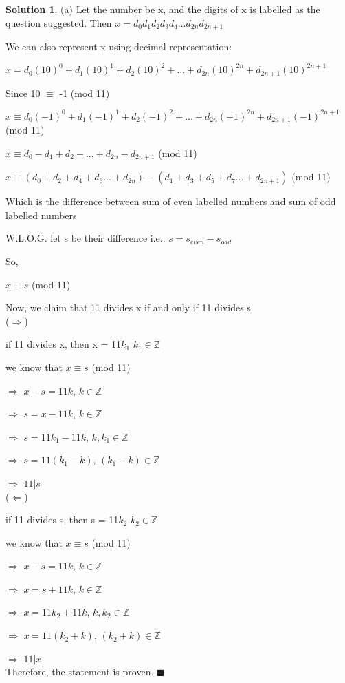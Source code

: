 \documentclass{article}
\theoremstyle{definition}
\newtheorem*{solution}{Solution}
\begin{document}
\begin{solution}
(a) Let the number be x, and the digits of x is labelled as the question suggested. Then \(x=d_0d_1d_2d_3d_4...d_{2n}d_{2n+1}\)

We can also represent x using decimal representation:

\(x=d_0(10)^0+d_1(10)^1+d_2(10)^2+...+d_{2n}(10)^{2n}+d_{2n+1}(10)^{2n+1}\)

Since 10 \(\equiv\) -1 (mod 11)

\(x \equiv d_0(-1)^0+d_1(-1)^1+d_2(-1)^2+...+d_{2n}(-1)^{2n}+d_{2n+1}(-1)^{2n+1}\) (mod 11)

\(x \equiv d_0-d_1+d_2-...+d_{2n}-d_{2n+1}\) (mod 11)

\(x \equiv (d_0+d_2+d_4+d_6...+d_{2n}) - (d_1+d_3+d_5+d_7...+d_{2n+1})\) (mod 11)

Which is the difference between sum of even labelled numbers and sum of odd labelled numbers

W.L.O.G. let s be their difference i.e.: \(s = s_{even} - s_{odd}\)

So, 

\(x \equiv s\) (mod 11)

Now, we claim that 11 divides x if and only if 11 divides s.\\

(\(\Rightarrow\))

if 11 divides x, then x = 11\(k_1\)  \(k_1\in\mathbb{Z}\)

we know that \(x \equiv s\) (mod 11)

\(\Rightarrow\) \(x-s = 11k\),   \(k \in \mathbb{Z}\)

\(\Rightarrow\) \(s = x - 11k\),   \(k \in \mathbb{Z}\)

\(\Rightarrow\) \(s = 11k_1 - 11k\),   \(k,k_1 \in \mathbb{Z}\)

\(\Rightarrow\) \(s = 11(k_1 - k)\),   \((k_1-k) \in \mathbb{Z}\)

\(\Rightarrow\) \(11 | s\)\\


(\(\Leftarrow\))

if 11 divides s, then s = 11\(k_2\)  \(k_2\in\mathbb{Z}\)

we know that \(x \equiv s\) (mod 11)

\(\Rightarrow\) \(x-s = 11k\),   \(k \in \mathbb{Z}\)

\(\Rightarrow\) \(x = s + 11k\),   \(k \in \mathbb{Z}\)

\(\Rightarrow\) \(x = 11k_2 + 11k\),   \(k,k_2 \in \mathbb{Z}\)

\(\Rightarrow\) \(x = 11(k_2 + k)\),   \((k_2+k) \in \mathbb{Z}\)

\(\Rightarrow\) \(11 | x\)\\

Therefore, the statement is proven. \(\blacksquare\)\\\\


\end{solution}
\end{document}
